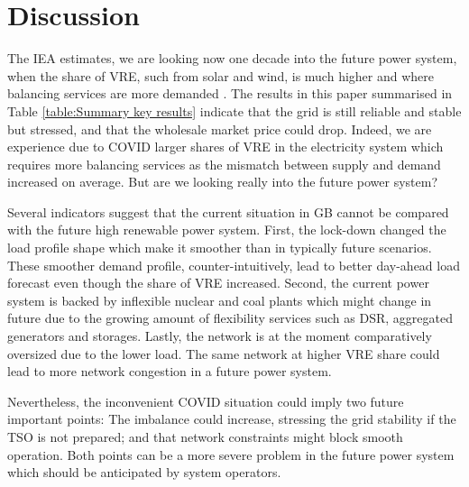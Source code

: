 \documentclass[energies,article,submit,moreauthors,pdftex]{Definitions/mdpi}
\begin{document}
\section{Discussion}

The IEA estimates, we are looking now one decade into the future power system, when the share of VRE, such from solar and wind, is much higher and where balancing services are more demanded \cite{IgorTodorovic2020Birol:Balance}. The results in this paper summarised in Table \ref{table:Summary key results} indicate that the grid is still reliable and stable but stressed, and that the wholesale market price could drop. Indeed, we are experience due to COVID larger shares of VRE in the electricity system which requires more balancing services as the mismatch between supply and demand increased on average. But are we looking really into the future power system? 

Several indicators suggest that the current situation in GB cannot be compared with the future high renewable power system. First, the lock-down changed the load profile shape which make it smoother than in typically future scenarios. These smoother demand profile, counter-intuitively, lead to better day-ahead load forecast even though the share of VRE increased. Second, the current power system is backed by inflexible nuclear and coal plants which might change in future due to the growing amount of flexibility services such as DSR, aggregated generators and storages. Lastly, the network is at the moment comparatively oversized due to the lower load. The same network at higher VRE share could lead to more network congestion in a future power system.

Nevertheless, the inconvenient COVID situation could imply two future important points: The imbalance could increase, stressing the grid stability if the TSO is not prepared; and that network constraints might block smooth operation. Both points can be a more severe problem in the future power system which should be anticipated by system operators. 
 
\end{document}
